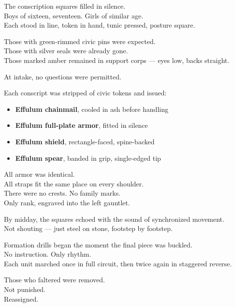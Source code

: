 \documentclass[12pt]{article}
\begin{document}
\vspace{1em}

The conscription squares filled in silence.\\
Boys of sixteen, seventeen. Girls of similar age.\\
Each stood in line, token in hand, tunic pressed, posture square.

Those with green-rimmed civic pins were expected.\\
Those with silver seals were already gone.\\
Those marked amber remained in support corps — eyes low, backs straight.

\vspace{1em}

At intake, no questions were permitted.

Each conscript was stripped of civic tokens and issued:

\begin{itemize}
\item \textbf{Effulum chainmail}, cooled in ash before handling
\item \textbf{Effulum full-plate armor}, fitted in silence
\item \textbf{Effulum shield}, rectangle-faced, spine-backed
\item \textbf{Effulum spear}, banded in grip, single-edged tip
\end{itemize}

All armor was identical.\\
All straps fit the same place on every shoulder.\\
There were no crests. No family marks.\\
Only rank, engraved into the left gauntlet.

\vspace{1em}

By midday, the squares echoed with the sound of synchronized movement.\\
Not shouting — just steel on stone, footstep by footstep.

Formation drills began the moment the final piece was buckled.\\
No instruction. Only rhythm.\\
Each unit marched once in full circuit, then twice again in staggered reverse.

Those who faltered were removed.\\
Not punished.\\
Reassigned.
\end{document}
